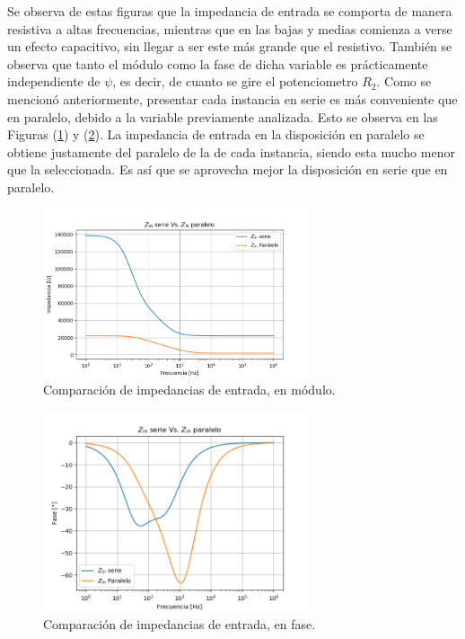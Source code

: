 Se observa de estas figuras que la impedancia de entrada se comporta de manera resistiva a altas frecuencias, mientras que en las bajas y medias comienza a verse un efecto capacitivo, sin llegar a ser este más grande que el resistivo. También se observa que tanto el módulo como la fase de dicha variable es prácticamente independiente de $\psi$, es decir, de cuanto se gire el potenciometro $R_2$. Como se mencionó anteriormente, presentar cada instancia en serie es más conveniente que en paralelo, debido a la variable previamente analizada. Esto se observa en las Figuras (\ref{fig:zin_comp_mod}) y (\ref{fig:zin_comp_ph}). La impedancia de entrada en la disposición en paralelo se obtiene justamente del paralelo de la de cada instancia, siendo esta mucho menor que la seleccionada. Es así que se aprovecha mejor la disposición en serie que en paralelo. 
\begin{figure}[H]
\centering
	\includegraphics[width=0.7\textwidth, trim = {0 0 0 1.35cm}, clip]{Imagenes/Z-Paralelo-Vs-Serie-Mod.png}
	\caption{Comparación de impedancias de entrada, en módulo.}
	\label{fig:zin_comp_mod}
\end{figure}
\begin{figure}[H]
\centering
		\includegraphics[width=0.7\textwidth, trim = {0 0 0 1.35cm}, clip]{Imagenes/Z-Paralelo-Vs-Serie-Ph.png}
	\caption{Comparación de impedancias de entrada, en fase.}
	\label{fig:zin_comp_ph}
\end{figure}

